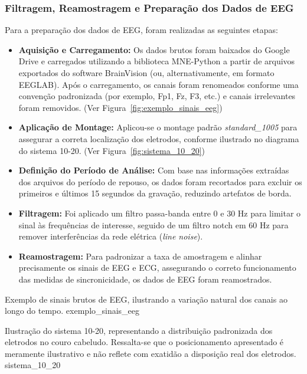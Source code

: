 \subsubsection{Filtragem, Reamostragem e Preparação dos Dados de EEG}
Para a preparação dos dados de EEG, foram realizadas as seguintes etapas:
\begin{itemize}
    \item \textbf{Aquisição e Carregamento:} Os dados brutos foram baixados do Google Drive e carregados utilizando a biblioteca MNE-Python a partir de arquivos exportados do software BrainVision (ou, alternativamente, em formato EEGLAB). Após o carregamento, os canais foram renomeados conforme uma convenção padronizada (por exemplo, Fp1, Fz, F3, etc.) e canais irrelevantes foram removidos. (Ver Figura~\ref{fig:exemplo_sinais_eeg})
    \item \textbf{Aplicação de Montage:} Aplicou-se o montage padrão \textit{standard\_1005} para assegurar a correta localização dos eletrodos, conforme ilustrado no diagrama do sistema 10-20. (Ver Figura~\ref{fig:sistema_10_20})
    \item \textbf{Definição do Período de Análise:} Com base nas informações extraídas dos arquivos do período de repouso, os dados foram recortados para excluir os primeiros e últimos 15 segundos da gravação, reduzindo artefatos de borda.
    \item \textbf{Filtragem:} Foi aplicado um filtro passa-banda entre 0 e 30 Hz para limitar o sinal às frequências de interesse, seguido de um filtro notch em 60 Hz para remover interferências da rede elétrica (\textit{line noise}).
    \item \textbf{Reamostragem:} Para padronizar a taxa de amostragem e alinhar precisamente os sinais de EEG e ECG, assegurando o correto funcionamento das medidas de sincronicidade, os dados de EEG foram reamostrados.
\end{itemize}

{Exemplo de sinais brutos de EEG, ilustrando a variação natural dos canais ao longo do tempo.}
{exemplo_sinais_eeg}

{Ilustração do sistema 10-20, representando a distribuição padronizada dos eletrodos no couro cabeludo. Ressalta-se que o posicionamento apresentado é meramente ilustrativo e não reflete com exatidão a disposição real dos eletrodos.}
{sistema_10_20}


